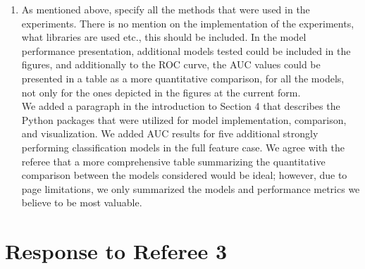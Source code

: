 \documentclass{amsart}[12pt]
\begin{document}
\begin{enumerate}
    \item   {\color{blue} 
        As mentioned above, specify all the methods that were used in the experiments. There is no mention on the implementation of the experiments, what libraries are used etc., this should be included. In the model performance presentation, additional models tested could be included in the figures, and additionally to the ROC curve, the AUC values could be presented in a table as a more quantitative comparison, for all the models, not only for the ones depicted in the figures at the current form.
        }\\

        We added a paragraph in the introduction to Section 4 that describes the Python packages that were 
        utilized for model implementation, comparison, and visualization.  We added AUC results for 
        five additional strongly performing classification models in the full feature case.  We agree 
        with the referee that a more comprehensive table summarizing the quantitative comparison between 
        the models considered would be ideal; however, due to page limitations, we only summarized the 
        models and performance metrics we believe to be most valuable. 
        
\end{enumerate}

\section{Response to Referee 3}
\end{document}
